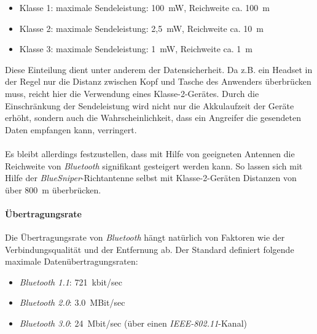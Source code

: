                 \begin{itemize}
                    \item{Klasse 1:} maximale Sendeleistung: 100~mW, Reichweite ca. 100~m
                    \item{Klasse 2:} maximale Sendeleistung: 2,5~mW, Reichweite ca. 10~m
                    \item{Klasse 3:} maximale Sendeleistung:   1~mW, Reichweite ca. 1~m
                \end{itemize}

                Diese Einteilung dient unter anderem der Datensicherheit. Da z.B. 
                ein Headset in der Regel nur die Distanz zwischen Kopf und Tasche
                des Anwenders überbrücken muss, reicht hier die Verwendung eines 
                Klasse-2-Gerätes. Durch die Einschränkung der Sendeleistung wird nicht nur die
                Akkulaufzeit der Geräte erhöht, sondern auch die Wahrscheinlichkeit,
                dass ein Angreifer die gesendeten Daten empfangen kann, verringert.\\
                \\
                Es bleibt allerdings festzustellen, dass mit Hilfe von geeigneten
                Antennen die Reichweite von \emph{Bluetooth} signifikant gesteigert werden
                kann. So lassen sich mit Hilfe der \emph{BlueSniper}-Richtantenne selbst mit
                Klasse-2-Geräten Distanzen von über 800~m überbrücken. \cite{BlueSniper}

            \paragraph{Übertragungsrate}
                Die Übertragungsrate von \emph{Bluetooth} hängt natürlich von Faktoren wie
                der Verbindungsqualität und der Entfernung ab. Der Standard definiert
                folgende maximale Datenübertragungsraten:

                \begin{itemize}
                    \item{\emph{Bluetooth 1.1}:} 721~kbit/sec
                    \item{\emph{Bluetooth 2.0}:} 3.0~MBit/sec
                    \item{\emph{Bluetooth 3.0}:} 24~Mbit/sec (über einen \emph{IEEE-802.11}-Kanal)
                \end{itemize}

